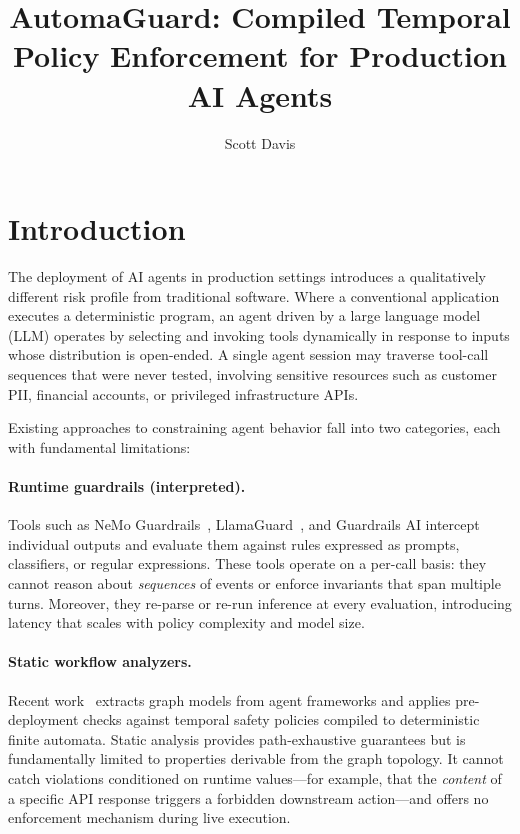 \documentclass[sigconf]{acmart}
\title{AutomaGuard: Compiled Temporal Policy Enforcement for Production AI Agents}
\author{Scott Davis}
\affiliation{%
  \institution{California State University, Sacramento}
  \city{Sacramento}
  \country{USA}
}
\begin{document}
\maketitle

\section{Introduction}

The deployment of AI agents in production settings introduces a qualitatively
different risk profile from traditional software. Where a conventional
application executes a deterministic program, an agent driven by a large
language model (LLM) operates by selecting and invoking tools dynamically in
response to inputs whose distribution is open-ended. A single agent session may
traverse tool-call sequences that were never tested, involving sensitive
resources such as customer PII, financial accounts, or privileged
infrastructure APIs.

Existing approaches to constraining agent behavior fall into two categories,
each with fundamental limitations:

\paragraph{Runtime guardrails (interpreted).}
Tools such as NeMo Guardrails~\cite{rebedea2023nemo}, LlamaGuard~\cite{inan2023llama},
and Guardrails AI intercept individual outputs and evaluate them against rules
expressed as prompts, classifiers, or regular expressions. These tools operate
on a per-call basis: they cannot reason about \emph{sequences} of events or
enforce invariants that span multiple turns. Moreover, they re-parse or
re-run inference at every evaluation, introducing latency that scales with
policy complexity and model size.

\paragraph{Static workflow analyzers.}
Recent work~\cite{xavier2026agentproof} extracts graph models from agent
frameworks and applies pre-deployment checks against temporal safety policies
compiled to deterministic finite automata. Static analysis provides
path-exhaustive guarantees but is fundamentally limited to properties derivable
from the graph topology. It cannot catch violations conditioned on runtime
values---for example, that the \emph{content} of a specific API response
triggers a forbidden downstream action---and offers no enforcement mechanism
during live execution.
\end{document}
